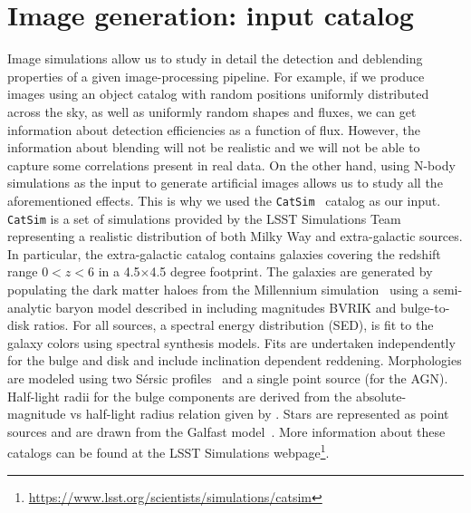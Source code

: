 \documentclass[twocolumn]{aastex62}
\begin{document}
\section{Image generation: input catalog}
\label{sec:inputs}
Image simulations allow us to study in detail the detection and deblending properties of a given image-processing pipeline. For example, if we produce images using an object catalog with random positions uniformly distributed across the sky, as well as uniformly random shapes and fluxes, we can get information about detection efficiencies as a function of flux.  However, the information about blending will not be realistic and we will not be able to capture some correlations present in real data. On the other hand, using N-body simulations as the input to generate artificial images allows us to study all the aforementioned effects. This is why we used the \texttt{CatSim}~\citep{2010SPIE.7738E..1OC,2014SPIE.9150E..14C} catalog as our input.  \texttt{CatSim} is a set of simulations provided by the LSST Simulations Team representing a realistic distribution of both Milky Way and extra-galactic sources. In particular, the extra-galactic catalog contains galaxies covering the redshift range $0 < z < 6$ in a 4.5$\times$4.5 degree footprint. The galaxies are generated by populating the dark matter haloes from the Millennium simulation~\citep{2005Nature.435.629S} using a semi-analytic baryon model described in \citet{2006MNRAS.366..499D} including magnitudes BVRIK and bulge-to-disk ratios. For all sources, a spectral energy distribution (SED), is fit to the galaxy colors using \citet{2003MNRAS.344.1000B} spectral synthesis models. Fits are undertaken independently for the bulge and disk and include inclination dependent reddening. Morphologies are modeled using two S\'{e}rsic profiles~\citep{1963BAAA....6...41S} and a single point source (for the AGN). Half-light radii for the bulge components are derived from the absolute-magnitude vs half-light radius relation given by \citet{2011A&A...534A...3G}. Stars are represented as point sources and are drawn from the Galfast model~\citep{2008ApJ...673..864J}. More information about these catalogs can be found at the LSST Simulations webpage\footnote{\url{https://www.lsst.org/scientists/simulations/catsim}}.
\end{document}
